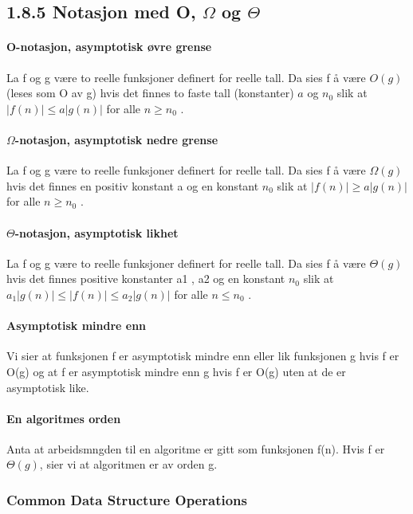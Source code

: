 \documentclass[11pt]{article}
\begin{document}
    \subsection{1.8.5 Notasjon med O, $\Omega$  og $\Theta$}
        \paragraph{O-notasjon, asymptotisk øvre grense}
        La f og g være to reelle funksjoner
        definert for reelle tall. Da sies f å være $O(g)$ (leses som O av g) hvis det finnes to
        faste tall (konstanter) $a$ og $n_0$ slik at $| f(n) | \leq a | g(n)|$ for alle $n \geq n_0$ .

        \paragraph{$\Omega$-notasjon, asymptotisk nedre grense}
        La f og g være to reelle funksjoner
        definert for reelle tall. Da sies f å være $\Omega(g)$ hvis det finnes en positiv konstant a
        og en konstant $n_0$ slik at $|f(n)| \geq a|g(n)|$ for alle $n \geq n_0$ .

        \paragraph{$\Theta$-notasjon, asymptotisk likhet}
        La f og g være to reelle funksjoner
        definert for reelle tall. Da sies f å være $\Theta(g)$ hvis det finnes positive konstanter
        a1 , a2 og en konstant $n_0$ slik at $a_1|g(n)| \leq |f(n)| \leq a_2|g(n)|$ for alle $n \leq n_0$ .

        \paragraph{Asymptotisk mindre enn}
        Vi sier at funksjonen f er asymptotisk mindre
        enn eller lik funksjonen g hvis f er O(g) og at f er asymptotisk mindre enn g
        hvis f er O(g) uten at de er asymptotisk like.

        \paragraph{En algoritmes orden}
        Anta at arbeidsmngden til en algoritme er gitt som
        funksjonen f(n). Hvis f er $\Theta(g)$, sier vi at algoritmen er av orden g.


        \subsubsection{Common Data Structure Operations}
\end{document}
